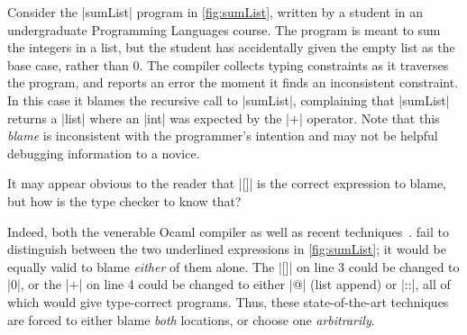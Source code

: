 


Consider the |sumList| program in \autoref{fig:sumList},
written by a student in an undergraduate Programming Languages
course.
%
The program is meant to sum the integers in a list, but
the student has accidentally given the empty list as the
base case, rather than 0.
%
The \ocaml compiler collects typing constraints as it
traverses the program, and reports an error the moment
it finds an inconsistent constraint.
%
In this case it blames the recursive call to |sumList|,
complaining that |sumList| returns a |list| where an |int|
was expected by the |+| operator.
%
Note that this \emph{blame} is inconsistent with the
programmer's intention and may not be helpful debugging
information to a novice.

It may appear obvious to the reader that
|[]| is the correct expression to blame,
but how is the type checker to know that?

Indeed, both the venerable
Ocaml compiler as well as
recent techniques~\citep{Zhang2014-lv,Loncaric2016-uk,Pavlinovic2014-mr}.
fail to distinguish between
the two underlined expressions
in \autoref{fig:sumList};
it would be equally valid
to blame \emph{either}
of them alone.
%
The |[]| on line 3 could be changed to |0|,
or the |+| on line 4 could be changed to
either |@| (list append) or |::|, all of
which would give type-correct programs.
%
Thus, these state-of-the-art techniques
are forced to either blame \emph{both}
locations, or choose one \emph{arbitrarily}.

